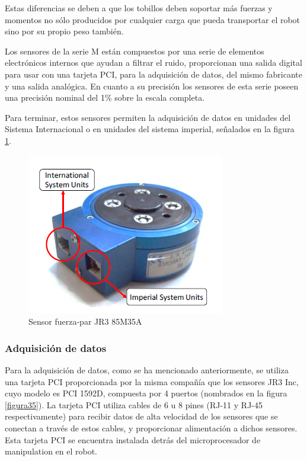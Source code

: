 Estas diferencias se deben a que los tobillos deben soportar más fuerzas y momentos no sólo producidos por cualquier carga que pueda transportar el robot sino por su propio peso también.

Los sensores de la serie M están compuestos por una serie de elementos electrónicos internos que ayudan a filtrar el ruido, proporcionan una salida digital para usar con una tarjeta PCI, para la adquisición de datos, del mismo fabricante y una salida analógica. En cuanto a su precisión los sensores de esta serie poseen una precisión nominal del 1\% sobre la escala completa.

Para terminar, estos sensores permiten la adquisición de datos en unidades del Sistema Internacional o en unidades del sistema imperial, señalados en la figura \ref{figura34}.

\begin{figure}[H]
\centering
\includegraphics[scale=0.8]{imagenes/apartado_3/34_jr3_sensor}
\caption{Sensor fuerza-par JR3 85M35A}
\label{figura34}
\end{figure}

\subsubsection{Adquisición de datos}

Para la adquisición de datos, como se ha mencionado anteriormente, se utiliza una tarjeta PCI proporcionada por la misma compañía que los sensores JR3 Inc, cuyo modelo es PCI 1592D, compuesta por 4 puertos (nombrados en la figura \ref{figura35}). La tarjeta PCI utiliza cables de 6 u 8 pines (RJ-11 y RJ-45 respectivamente) para recibir datos de alta velocidad de los sensores que se conectan a través de estos cables, y proporcionar alimentación a dichos sensores. Esta tarjeta PCI se encuentra instalada detrás del microprocesador de manipulation en el robot.

